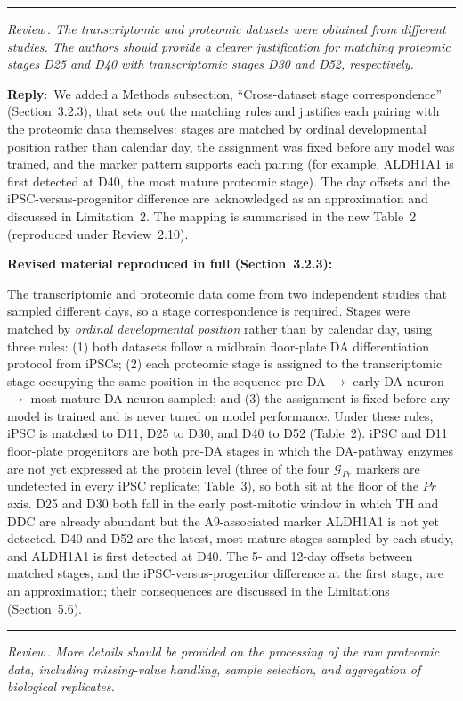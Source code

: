 \documentclass[11pt]{article}
\newcounter{reviewer}
\newcounter{point}[reviewer]
\renewcommand{\thepoint}{Review\,\thereviewer.\arabic{point}}
\newcommand{\point}[1]{\refstepcounter{point}  \bigskip \hrule \medskip \noindent \textit{{\fontseries{b}\selectfont \thepoint } #1}\par}
\newcommand{\reply}{\medskip \noindent \textbf{Reply}:\ }
\newcommand{\revisedheading}[1]{\medskip\noindent\textbf{Revised material
  reproduced in full (#1):}\par}
\newenvironment{revised}{\par\color{red}}{\par}
\begin{document}
\point{The transcriptomic and proteomic datasets were obtained from different studies. The authors should provide a clearer justification for matching proteomic stages D25 and D40 with transcriptomic stages D30 and D52, respectively.}

\reply{We added a Methods subsection, ``Cross-dataset stage correspondence'' (Section~3.2.3), that sets out the matching rules and justifies each pairing with the proteomic data themselves: stages are matched by ordinal developmental position rather than calendar day, the assignment was fixed before any model was trained, and the marker pattern supports each pairing (for example, ALDH1A1 is first detected at D40, the most mature proteomic stage). The day offsets and the iPSC-versus-progenitor difference are acknowledged as an approximation and discussed in Limitation~2. The mapping is summarised in the new Table~2 (reproduced under Review~2.10).}

\revisedheading{Section~3.2.3}
\begin{revised}
The transcriptomic and proteomic data come from two independent studies that sampled different days, so a stage correspondence is required. Stages were matched by \textit{ordinal developmental position} rather than by calendar day, using three rules: (1) both datasets follow a midbrain floor-plate DA differentiation protocol from iPSCs; (2) each proteomic stage is assigned to the transcriptomic stage occupying the same position in the sequence pre-DA $\to$ early DA neuron $\to$ most mature DA neuron sampled; and (3) the assignment is fixed before any model is trained and is never tuned on model performance. Under these rules, iPSC is matched to D11, D25 to D30, and D40 to D52 (Table~2). iPSC and D11 floor-plate progenitors are both pre-DA stages in which the DA-pathway enzymes are not yet expressed at the protein level (three of the four $\mathcal{G}_{Pr}$ markers are undetected in every iPSC replicate; Table~3), so both sit at the floor of the $Pr$ axis. D25 and D30 both fall in the early post-mitotic window in which TH and DDC are already abundant but the A9-associated marker ALDH1A1 is not yet detected. D40 and D52 are the latest, most mature stages sampled by each study, and ALDH1A1 is first detected at D40. The 5- and 12-day offsets between matched stages, and the iPSC-versus-progenitor difference at the first stage, are an approximation; their consequences are discussed in the Limitations (Section~5.6).
\end{revised}

\point{More details should be provided on the processing of the raw proteomic data, including missing-value handling, sample selection, and aggregation of biological replicates.}
\end{document}
